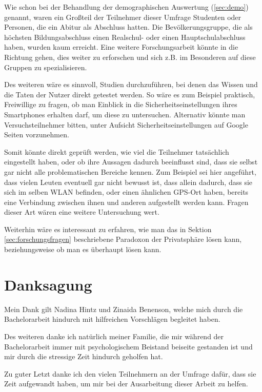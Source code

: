Wie schon bei der Behandlung der demographischen Auswertung (\ref{sec:demo}) genannt, waren ein Großteil der Teilnehmer dieser Umfrage Studenten oder Personen, die ein Abitur als Abschluss hatten. Die Bevölkerungsgruppe, die als höchsten Bildungsabschluss einen Realschul- oder einen Hauptschulabschluss haben, wurden kaum erreicht. Eine weitere Forschungsarbeit könnte in die Richtung gehen, dies weiter zu erforschen und sich z.B. im Besonderen auf diese Gruppen zu spezialisieren.

Des weiteren wäre es sinnvoll, Studien durchzuführen, bei denen das Wissen und die Taten der Nutzer direkt getestet werden. So wäre es zum Beispiel praktisch, Freiwillige zu fragen, ob man Einblick in die Sicherheitseinstellungen ihres Smartphones erhalten darf, um diese zu untersuchen. Alternativ könnte man Versuchsteilnehmer bitten, unter Aufsicht Sicherheitseinstellungen auf Google Seiten vorzunehmen.

Somit könnte direkt geprüft werden, wie viel die Teilnehmer tatsächlich eingestellt haben, oder ob ihre Aussagen dadurch beeinflusst sind, dass sie selbst gar nicht alle problematischen Bereiche kennen. Zum Beispiel sei hier angeführt, dass vielen Leuten eventuell gar nicht bewusst ist, dass allein dadurch, dass sie sich im selben WLAN befinden, oder einen ähnlichen GPS-Ort haben, bereits eine Verbindung zwischen ihnen und anderen aufgestellt werden kann. Fragen dieser Art wären eine weitere Untersuchung wert.

Weiterhin wäre es interessant zu erfahren, wie man das in Sektion \ref{sec:forschungsfragen} beschriebene Paradoxon der Privatsphäre lösen kann, beziehungsweise ob man es überhaupt lösen kann.


\chapter{Danksagung}
Mein Dank gilt Nadina Hintz und Zinaida Benenson, welche mich durch die Bachelorarbeit hindurch mit hilfreichen Vorschlägen begleitet haben.

Des weiteren danke ich natürlich meiner Familie, die mir während der Bachelorarbeit immer mit psychologischem Beistand beiseite gestanden ist und mir durch die stressige Zeit hindurch geholfen hat.

Zu guter Letzt danke ich den vielen Teilnehmern an der Umfrage dafür, dass sie Zeit aufgewandt haben, um mir bei der Ausarbeitung dieser Arbeit zu helfen.